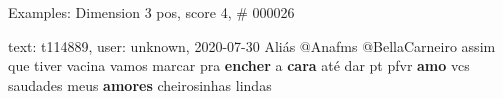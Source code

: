 \begin{frame}{Examples: Dimension 3 pos, score 4, \# 000026}
\footnotesize
\begin{exampleblock}{text: t114889, user: unknown, 2020-07-30}
Aliás @Anafms @BellaCarneiro assim que tiver vacina vamos marcar pra 
\textbf{encher} a \textbf{cara} até dar pt pfvr \textbf{amo} vcs saudades meus 
\textbf{amores} cheirosinhas lindas 
\end{exampleblock}
\end{frame}
